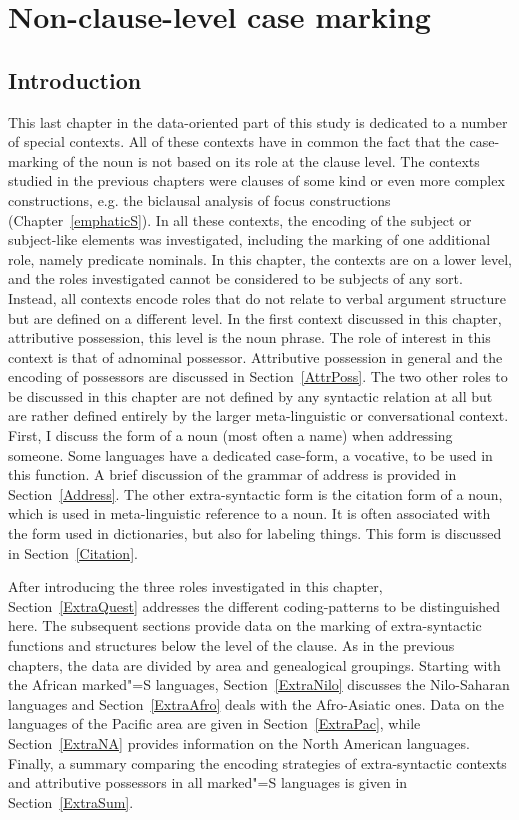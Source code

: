 \chapter{Non-clause-level case marking}\label{extrasyn}

\section{Introduction}

This last chapter in the data-oriented part of this study is dedicated to a number of special contexts. 
All of these contexts have in common the fact that the case-marking of the noun is not based on its role at the clause level. 
The contexts studied in the previous chapters were clauses of some kind or even more complex constructions, e.g. the biclausal analysis of focus constructions (Chapter~\ref{emphaticS}). 
In all these contexts, the encoding of the subject or subject-like elements was investigated, including  the marking of one additional role, namely predicate nominals.  
In this chapter, the contexts are on a lower level, and the roles investigated cannot be considered to be subjects of any sort. 
Instead, all contexts encode roles that do not relate to verbal argument structure but are defined on a different level.
In the first context discussed in this chapter, attributive possession, this level is the noun phrase. 
The role of interest in this context is that of adnominal possessor. Attributive possession in general and the encoding of possessors are discussed in Section~\ref{AttrPoss}.
The two other roles to be discussed in this chapter are not defined by any syntactic relation at all but are rather defined entirely by the larger meta-linguistic or conversational context.
First, I discuss the form of a noun (most often a name) when addressing someone. 
Some languages have a dedicated case-form, a vocative, to be used in this function. 
A brief discussion of the grammar of address is provided in Section~\ref{Address}.
The other extra-syntactic form is the citation form of a noun, which is used in meta-linguistic reference to a noun. 
It is often associated with the form used in dictionaries, but also for labeling things. This form is discussed in Section~\ref{Citation}. 

After introducing the three roles investigated in this chapter, Section~\ref{ExtraQuest} addresses the different coding-patterns to be distinguished here.
The subsequent sections provide data on the marking of extra-syntactic functions and structures below the level of the clause. 
As in the previous chapters, the data are divided by area and genealogical groupings. 
Starting with the African marked"=S languages, Section~\ref{ExtraNilo} discusses the Nilo-Saharan languages and Section~\ref{ExtraAfro} deals with the Afro-Asiatic ones. 
Data on the languages of the Pacific area are given in Section~\ref{ExtraPac}, while Section~\ref{ExtraNA} provides information on the North American languages.
Finally, a summary comparing the encoding strategies of extra-syntactic contexts and attributive possessors in all marked"=S languages is given in Section~\ref{ExtraSum}. 
 

